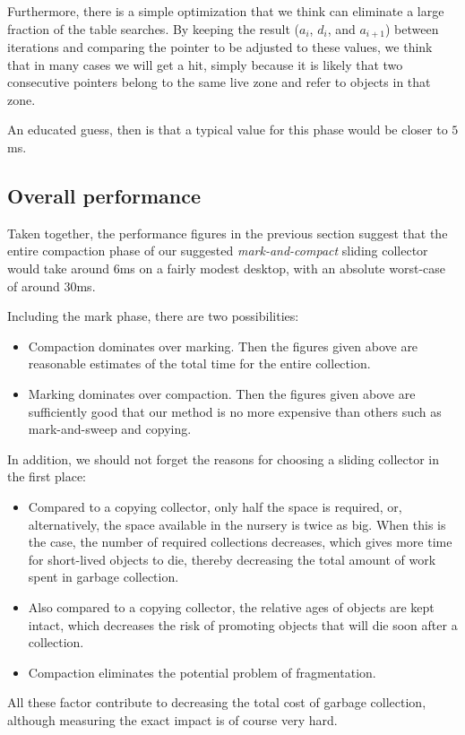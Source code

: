 Furthermore, there is a simple optimization that we think can
eliminate a large fraction of the table searches.  By keeping the
result ($a_i$, $d_i$, and $a_{i+1}$) between iterations and comparing
the pointer to be adjusted to these values, we think that in many
cases we will get a hit, simply because it is likely that two
consecutive pointers belong to the same live zone and refer to objects
in that zone.  

An educated guess, then is that a typical value for this phase would
be closer to $5$ms. 

\subsection{Overall performance}

Taken together, the performance figures in the previous section
suggest that the entire compaction phase of our suggested
\emph{mark-and-compact} sliding collector would take around $6$ms on a
fairly modest desktop, with an absolute worst-case of around $30$ms.

Including the mark phase, there are two possibilities:

\begin{itemize}
\item Compaction dominates over marking.  Then the figures given above
  are reasonable estimates of the total time for the entire
  collection.
\item Marking dominates over compaction.  Then the figures given above
  are sufficiently good that our method is no more expensive than
  others such as mark-and-sweep and copying. 
\end{itemize}

In addition, we should not forget the reasons for choosing a
sliding collector in the first place:

\begin{itemize}
\item Compared to a copying collector, only half the space is
  required, or, alternatively, the space available in the nursery is
  twice as big.  When this is the case, the number of required
  collections decreases, which gives more time for short-lived objects
  to die, thereby decreasing the total amount of work spent in garbage
  collection. 
\item Also compared to a copying collector, the relative ages of
  objects are kept intact, which decreases the risk of promoting
  objects that will die soon after a collection. 
\item Compaction eliminates the potential problem of fragmentation. 
\end{itemize}

All these factor contribute to decreasing the total cost of garbage
collection, although measuring the exact impact is of course very
hard. 
